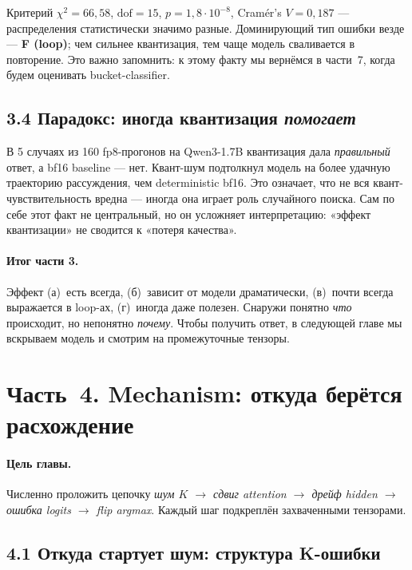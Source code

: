 \documentclass[a4paper,12pt]{article}
\begin{document}
Критерий $\chi^2 = 66{,}58$, $\text{dof} = 15$, $p = 1{,}8 \cdot 10^{-8}$,
Cramér's $V = 0{,}187$ --- распределения статистически значимо разные.
Доминирующий тип ошибки везде --- \textbf{F (loop)}; чем сильнее
квантизация, тем чаще модель сваливается в повторение. Это важно запомнить:
к этому факту мы вернёмся в части~7, когда будем оценивать bucket-classifier.

\subsection*{3.4 Парадокс: иногда квантизация \textit{помогает}}

В 5 случаях из 160 fp8-прогонов на Qwen3-1.7B квантизация дала
\textit{правильный} ответ, а bf16 baseline --- нет. Квант-шум подтолкнул
модель на более удачную траекторию рассуждения, чем deterministic bf16.
Это означает, что не вся квант-чувствительность вредна --- иногда она
играет роль случайного поиска. Сам по себе этот факт не центральный, но
он усложняет интерпретацию: «эффект квантизации» не сводится к «потеря
качества».

\paragraph{Итог части 3.} Эффект (а)~есть всегда, (б)~зависит от модели
драматически, (в)~почти всегда выражается в loop-ах, (г)~иногда даже
полезен. Снаружи понятно \textit{что} происходит, но непонятно
\textit{почему}. Чтобы получить ответ, в следующей главе мы вскрываем
модель и смотрим на промежуточные тензоры.

\clearpage

\section*{Часть~4. Mechanism: откуда берётся расхождение}

\paragraph{Цель главы.} Численно проложить цепочку
\textit{шум $K$ $\to$ сдвиг attention $\to$ дрейф hidden $\to$ ошибка
logits $\to$ flip argmax}. Каждый шаг подкреплён захваченными тензорами.

\subsection*{4.1 Откуда стартует шум: структура K-ошибки}
\end{document}
